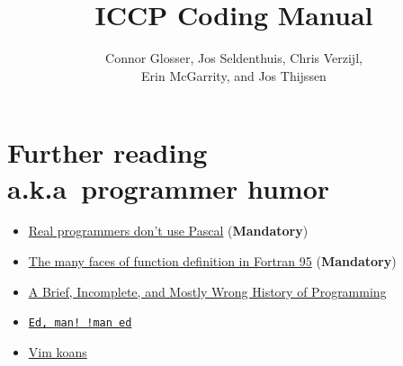 \documentclass[openany,oneside]{report}
\newcommand{\Chapter}[2]{\chapter[#1]{#1\\[1ex]\Large#2}}
\begin{document}
\title{ICCP Coding Manual}
\author{Connor Glosser, Jos Seldenthuis, Chris Verzijl, \\ 
  Erin McGarrity, and Jos Thijssen}
\maketitle
\tableofcontents






\appendix







\Chapter{Further reading}{a.k.a\ programmer humor}
\begin{itemize}
  \item \href{http://www.pbm.com/~lindahl/real.programmers.html}{Real programmers don't use Pascal} (\textbf{Mandatory})
  \item \href{https://gist.github.com/alanbriolat/3135713#file-fortran_hell-f95}{The many faces of function definition in Fortran 95} (\textbf{Mandatory})
  \item \href{http://james-iry.blogspot.com/2009/05/brief-incomplete-and-mostly-wrong.html}{A Brief, Incomplete, and Mostly Wrong History of Programming}
  \item \href{https://www.gnu.org/fun/jokes/ed-msg.html}{\texttt{Ed, man! !man ed}}
  \item \href{http://blog.sanctum.geek.nz/vim-koans/}{Vim koans}
\end{itemize}
\end{document}
